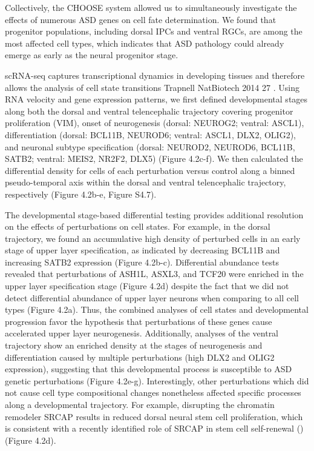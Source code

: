 Collectively, the CHOOSE system allowed us to simultaneously investigate the effects of numerous ASD genes on cell fate determination. We found that progenitor populations, including dorsal IPCs and ventral RGCs, are among the most affected cell types, which indicates that ASD pathology could already emerge as early as the neural progenitor stage.  


scRNA-seq captures transcriptional dynamics in developing tissues and therefore allows the analysis of cell state transitions {Trapnell NatBiotech 2014} 27 . Using RNA velocity and gene expression patterns, we first defined developmental stages along both the dorsal and ventral telencephalic trajectory covering progenitor proliferation (VIM), onset of neurogenesis (dorsal: NEUROG2; ventral: ASCL1), differentiation (dorsal: BCL11B, NEUROD6; ventral: ASCL1, DLX2, OLIG2), and neuronal subtype specification (dorsal: NEUROD2, NEUROD6, BCL11B, SATB2; ventral: MEIS2, NR2F2, DLX5) (Figure 4.2c-f). We then calculated the differential density for cells of each perturbation versus control along a binned pseudo-temporal axis within the dorsal and ventral telencephalic trajectory, respectively (Figure 4.2b-e, Figure S4.7). 

The developmental stage-based differential testing provides additional resolution on the effects of perturbations on cell states. For example, in the dorsal trajectory, we found an accumulative high density of perturbed cells in an early stage of upper layer specification, as indicated by decreasing BCL11B and increasing SATB2 expression (Figure 4.2b-c). Differential abundance tests revealed that perturbations of ASH1L, ASXL3, and TCF20 were enriched in the upper layer specification stage (Figure 4.2d) despite the fact that we did not detect differential abundance of upper layer neurons when comparing to all cell types (Figure 4.2a). Thus, the combined analyses of cell states and developmental progression favor the hypothesis that perturbations of these genes cause accelerated upper layer neurogenesis. Additionally, analyses of the ventral trajectory show an enriched density at the stages of neurogenesis and differentiation caused by multiple perturbations (high DLX2 and OLIG2 expression), suggesting that this developmental process is susceptible to ASD genetic perturbations (Figure 4.2e-g). Interestingly, other perturbations which did not cause cell type compositional changes nonetheless affected specific processes along a developmental trajectory. For example, disrupting the chromatin remodeler SRCAP results in reduced dorsal neural stem cell proliferation, which is consistent with a recently identified role of SRCAP in stem cell self-renewal (\cite{funayama_chchd2_2015})(Figure 4.2d). 

